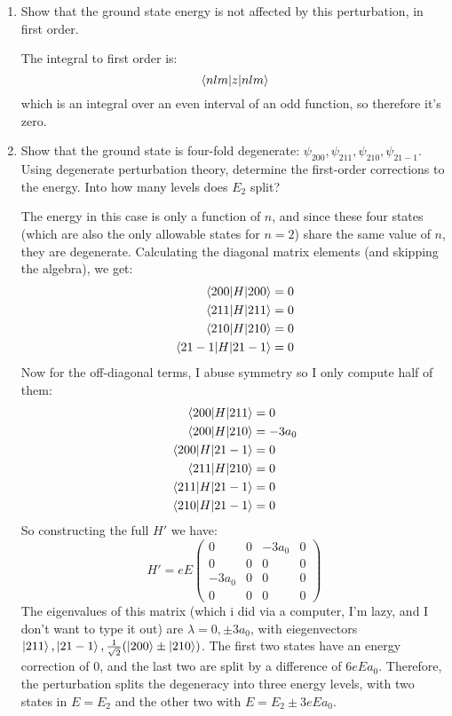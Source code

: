 \documentclass[10pt]{article}
\begin{document}
	\begin{enumerate}[label=(\alph*)]
		\item Show that the ground state energy is not affected by this perturbation, in first order. 
		
		\begin{solution}
			The integral to first order is: 
			\[ \expval{z}{nlm}\] 
			which is an integral over an even interval of an odd function, so therefore it's zero.
		\end{solution}
		\item Show that the ground state is four-fold degenerate: $\psi_{200}, \psi_{211}, \psi_{210}, \psi_{21-1}$. Using degenerate perturbation theory, determine the first-order corrections to the energy. Into how many levels does $E_2$ split?
		
		\begin{solution}
			The energy in this case is only a function of $n$, and since these four states (which are also the only allowable states for $n=2$) share the same value of $n$, they are degenerate. Calculating the diagonal matrix elements (and skipping the algebra), we get:
			\begin{align*}
				\expval{H}{200} &= 0\\
				\expval{H}{211} &= 0\\
				\expval{H}{210} &= 0\\
				\expval{H}{21-1} &= 0
			\end{align*}
			Now for the off-diagonal terms, I abuse symmetry so I only compute half of them: 
			\begin{align*}
				\mel{200}{H}{211} &= 0\\
				\mel{200}{H}{210} &= -3a_0\\
				\mel{200}{H}{21-1} &= 0\\
				\mel{211}{H}{210} &= 0\\
				\mel{211}{H}{21-1} &= 0\\
				\mel{210}{H}{21-1} &= 0\\
			\end{align*}
			So constructing the full $H'$ we have: 
			\[ H' = eE \begin{pmatrix}
				0 & 0 & -3a_0 & 0\\
				0 & 0 & 0 & 0\\
				-3a_0 & 0 & 0 & 0\\
				0 & 0 & 0 & 0
			\end{pmatrix}\]
			The eigenvalues of this matrix (which i did via a computer, I'm lazy, and I don't want to type it out) are $\lambda = 0, \pm 3a_0$, with eiegenvectors $\ket{211}, \ket{21-1}, \frac{1}{\sqrt{2}}(\ket{200} \pm \ket{210})$. The first two states have an energy correction of 0, and the last two are split by a difference of $6eEa_0$. Therefore, the perturbation splits the degeneracy into three energy levels, with two states in $E = E_2$ and the other two with $E = E_2 \pm 3eE a_0$.

\end{solution}
\end{enumerate}
\end{document}
